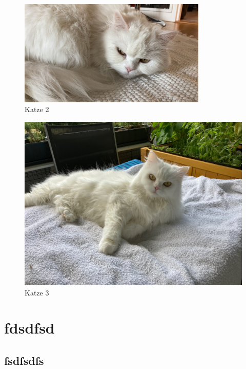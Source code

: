 \documentclass[12pt,ngerman,parskip=half]{scrartcl}
\begin{document}
\begin{figure}[h]
\begin{center}
\includegraphics[width=0.8\textwidth]{Bilder/miau}
\end{center}
\caption{Katze 2}\label{fig:miau}
\end{figure}

\blindtext[5]


\begin{figure}[b]
\begin{center}
\includegraphics[width=\textwidth]{Bilder/Katze1}
\end{center}
\caption{Katze 3}\label{fig:katze1}
\end{figure}

\blindtext[5]

\section{fdsdfsd}
\subsection{fsdfsdfs}
\end{document}
